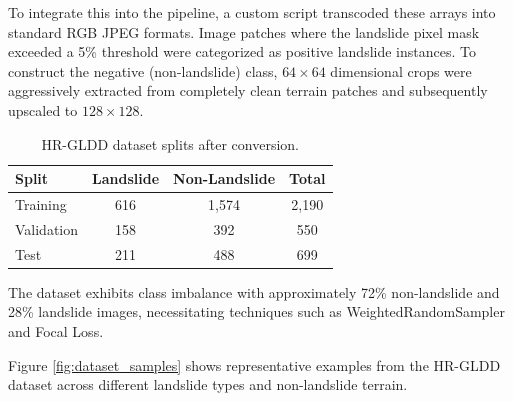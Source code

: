 \documentclass[12pt,a4paper]{report}
\begin{document}
To integrate this into the pipeline, a custom script transcoded these arrays into standard RGB JPEG formats. Image patches where the landslide pixel mask exceeded a 5\% threshold were categorized as positive landslide instances. To construct the negative (non-landslide) class, $64 \times 64$ dimensional crops were aggressively extracted from completely clean terrain patches and subsequently upscaled to $128 \times 128$.

\begin{table}[H]
\begin{center}
\caption{HR-GLDD dataset splits after conversion.}\label{tab:hrgldd}
\begin{tabular}{lccc}
\hline
\textbf{Split} & \textbf{Landslide} & \textbf{Non-Landslide} & \textbf{Total} \\
\hline
Training   & 616   & 1,574 & 2,190 \\
Validation & 158   & 392   & 550 \\
Test       & 211   & 488   & 699 \\
\hline
\end{tabular}
\end{center}
\end{table}

The dataset exhibits class imbalance with approximately 72\% non-landslide and 28\% landslide images, necessitating techniques such as WeightedRandomSampler and Focal Loss.

Figure \ref{fig:dataset_samples} shows representative examples from the HR-GLDD dataset across different landslide types and non-landslide terrain.
\end{document}

